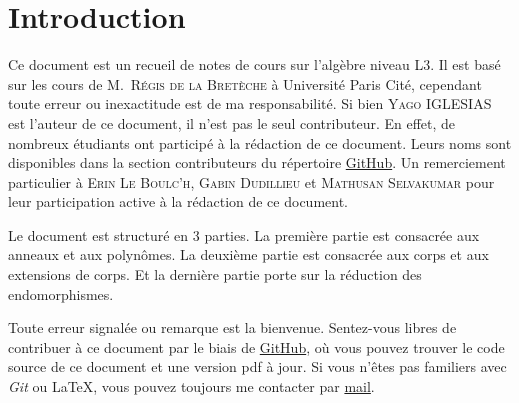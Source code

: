 
\section{Introduction}

Ce document est un recueil de notes de cours sur l'algèbre niveau L3. Il est
basé sur les cours de M.~\textsc{Régis de la Bretèche} à Université Paris Cité, cependant toute
erreur ou inexactitude est de ma responsabilité.
Si bien \textsc{Yago IGLESIAS} est l'auteur de ce document, il n'est pas
le seul contributeur. En effet, de nombreux étudiants ont participé à la
rédaction de ce document. Leurs noms sont disponibles dans la section
contributeurs du répertoire \href{https://github.com/Yag000/algebre-II-notes/graphs/contributors}{GitHub}.
Un remerciement particulier à \textsc{Erin Le Boulc'h}, \textsc{Gabin Dudillieu} et \textsc{Mathusan Selvakumar} pour leur
participation active à la rédaction de ce document.
\vspace{0.5cm}

Le document est structuré en 3 parties. La première partie est consacrée aux anneaux et aux polynômes.
La deuxième partie est consacrée aux corps et aux extensions de corps. Et la dernière partie porte sur
la réduction des endomorphismes.
\vspace{0.5cm}

Toute erreur signalée ou remarque est la bienvenue.
Sentez-vous libres de contribuer à ce document par le biais de \href{https://github.com/Yag000/algebre-II-notes}{GitHub},
où vous pouvez trouver le code source de ce document et une version pdf à jour.
Si vous n'êtes pas familiers avec \textit{Git} ou \LaTeX, vous pouvez toujours me contacter
par \href{mailto: yago.iglesias.vazquez@gmail.com}{mail}.






